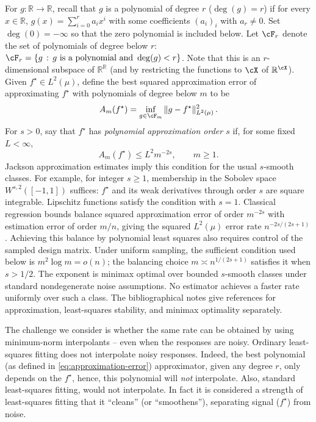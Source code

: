 \documentclass[11pt,twoside]{article}
\newcommand{\R}{\mathbb R}
\theoremstyle{definition}
\theoremstyle{remark}
\begin{document}
For $g:\R\to\R$, recall that $g$ is a polynomial of degree $r$ ($\deg(g)=r$)
if for every $x\in \R$, $g(x) = \sum_{i=0}^r a_i x^i$ with some coefficients $(a_i)_i$ with $a_r\ne 0$.
Set $\deg(0)=-\infty$ so that the zero polynomial is included below.
Let $\cF_r$ denote the set of polynomials of degree below $r$:
$\cF_r = \{ g \,:\, g \text{ is a polynomial and } \deg(g)<r \}$. Note that this is
an $r$-dimensional subspace of $\R^{\R}$ (and by restricting the functions to $\cX$ of $\R^\cX$).
Given $f^\star\in L^2(\mu)$,
define the best
squared approximation error of approximating $f^\star$
with polynomials of degree below $m$ to be
\begin{equation}
 A_m(f^\star)=\inf_{g\in \cF_m}\|g-f^\star\|_{L^2(\mu)}^2\,.
 \label{eq:approximation-error}
\end{equation}
For $s>0$, say that $f^\star$ has
\emph{polynomial approximation order $s$} if, for some fixed $L<\infty$,
\begin{equation}
 A_m(f^\star)\le L^2m^{-2s},\qquad m\ge1.
 \label{eq:s-smooth-approximation}
\end{equation}
Jackson approximation estimates imply this condition for the usual
$s$-smooth classes. For example, for integer $s\ge1$, membership in the
Sobolev space $W^{s,2}([-1,1])$ suffices: $f^\star$ and its weak derivatives
through order $s$ are square integrable. Lipschitz functions satisfy the
condition with $s=1$.
Classical regression bounds balance squared approximation error of order
$m^{-2s}$ with estimation error of order $m/n$, giving the squared
$L^2(\mu)$ error rate $n^{-2s/(2s+1)}$. Achieving this balance by polynomial
least squares also requires control of the sampled design matrix. Under
uniform sampling, the sufficient condition used below is
$m^2\log m=o(n)$; the balancing choice $m\asymp n^{1/(2s+1)}$ satisfies it
when $s>1/2$. The exponent is minimax optimal over bounded $s$-smooth
classes under standard nondegenerate noise assumptions. No estimator
achieves a faster rate uniformly over such a class.
The bibliographical notes give references for approximation,
least-squares stability, and minimax optimality separately.

The challenge we consider is whether the same rate can be obtained by using minimum-norm
interpolants -- even when the responses are noisy.
Ordinary least-squares fitting does not interpolate noisy responses.
Indeed, the best polynomial (as defined in \cref{eq:approximation-error}) approximator,
given any degree $r$, 
only depends on the $f^\star$, hence, this polynomial will \emph{not} interpolate.
Also, standard least-squares fitting, would not interpolate. In fact it is considered
a strength of least-squares fitting that it ``cleans'' (or ``smoothens''), 
separating signal ($f^\star$) from noise.
\end{document}
